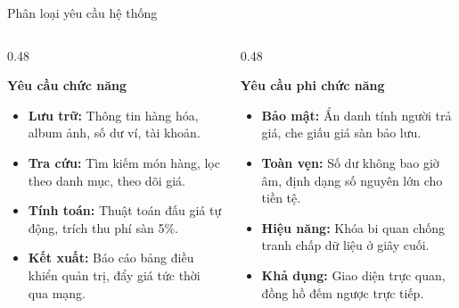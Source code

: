 \documentclass[aspectratio=169, 10pt]{beamer}
\begin{document}
\begin{frame}{Phân loại yêu cầu hệ thống}
    \begin{columns}[t]
        \begin{column}{0.48\textwidth}
            \begin{block}{\textbf{Yêu cầu chức năng}}
                \begin{itemize}
                    \item \textbf{Lưu trữ:} Thông tin hàng hóa, album ảnh, số dư ví, tài khoản.
                    \item \textbf{Tra cứu:} Tìm kiếm món hàng, lọc theo danh mục, theo dõi giá.
                    \item \textbf{Tính toán:} Thuật toán đấu giá tự động, trích thu phí sàn 5\%.
                    \item \textbf{Kết xuất:} Báo cáo bảng điều khiển quản trị, đẩy giá tức thời qua mạng.
                \end{itemize}
            \end{block}
        \end{column}
        \begin{column}{0.48\textwidth}
            \begin{block}{\textbf{Yêu cầu phi chức năng}}
                \begin{itemize}
                    \item \textbf{Bảo mật:} Ẩn danh tính người trả giá, che giấu giá sàn bảo lưu.
                    \item \textbf{Toàn vẹn:} Số dư không bao giờ âm, định dạng số nguyên lớn cho tiền tệ.
                    \item \textbf{Hiệu năng:} Khóa bi quan chống tranh chấp dữ liệu ở giây cuối.
                    \item \textbf{Khả dụng:} Giao diện trực quan, đồng hồ đếm ngược trực tiếp.
                \end{itemize}
            \end{block}
        \end{column}
    \end{columns}
\end{frame}
\end{document}
